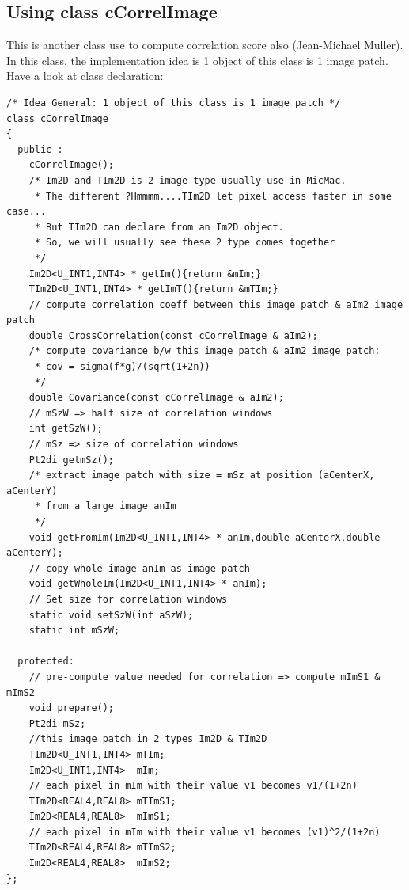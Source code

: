 \documentclass[twoside]{article}
\begin{document}
\subsection{Using class cCorrelImage}
This is another class use to compute correlation score also (Jean-Michael Muller).
In this class, the implementation idea is 1 object of this class is 1 image patch.
Have a look at class declaration: 

\begin{lstlisting}
/* Idea General: 1 object of this class is 1 image patch */
class cCorrelImage
{
  public :
    cCorrelImage();
    /* Im2D and TIm2D is 2 image type usually use in MicMac.
     * The different ?Hmmmm....TIm2D let pixel access faster in some case...
     * But TIm2D can declare from an Im2D object.
     * So, we will usually see these 2 type comes together
     */
    Im2D<U_INT1,INT4> * getIm(){return &mIm;}
    TIm2D<U_INT1,INT4> * getImT(){return &mTIm;}
    // compute correlation coeff between this image patch & aIm2 image patch
    double CrossCorrelation(const cCorrelImage & aIm2);
    /* compute covariance b/w this image patch & aIm2 image patch:
     * cov = sigma(f*g)/(sqrt(1+2n))     
     */
    double Covariance(const cCorrelImage & aIm2);
    // mSzW => half size of correlation windows
    int getSzW();
    // mSz => size of correlation windows
    Pt2di getmSz();
    /* extract image patch with size = mSz at position (aCenterX, aCenterY) 
     * from a large image anIm
     */
    void getFromIm(Im2D<U_INT1,INT4> * anIm,double aCenterX,double aCenterY);
    // copy whole image anIm as image patch
    void getWholeIm(Im2D<U_INT1,INT4> * anIm);
    // Set size for correlation windows
    static void setSzW(int aSzW);
    static int mSzW;

  protected:
    // pre-compute value needed for correlation => compute mImS1 & mImS2
    void prepare();
    Pt2di mSz;
    //this image patch in 2 types Im2D & TIm2D
    TIm2D<U_INT1,INT4> mTIm; 
    Im2D<U_INT1,INT4>  mIm;
    // each pixel in mIm with their value v1 becomes v1/(1+2n)
    TIm2D<REAL4,REAL8> mTImS1; 
    Im2D<REAL4,REAL8>  mImS1;
    // each pixel in mIm with their value v1 becomes (v1)^2/(1+2n)
    TIm2D<REAL4,REAL8> mTImS2; 
    Im2D<REAL4,REAL8>  mImS2;
};
\end{lstlisting}
\end{document}
